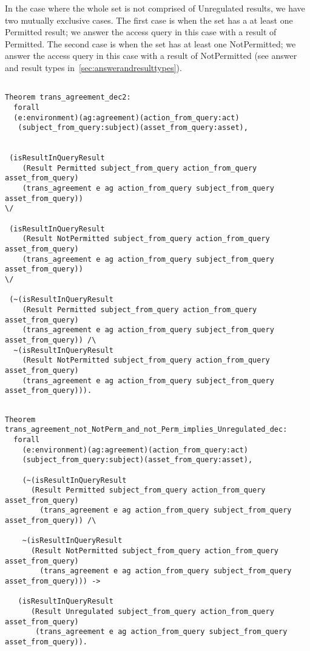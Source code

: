 In the case where the whole set is not comprised of Unregulated results, we have two mutually exclusive cases. The first case is when the set has a at least one Permitted result; we answer the access query in this case with a result of Permitted. The second case is when the set has at least one NotPermitted; we answer the access query in this case with a result of NotPermitted (see answer and result types in~\ref{sec:answerandresulttypes}).


\begin{lstlisting}

Theorem trans_agreement_dec2:
  forall
  (e:environment)(ag:agreement)(action_from_query:act)
   (subject_from_query:subject)(asset_from_query:asset),


 (isResultInQueryResult 
    (Result Permitted subject_from_query action_from_query asset_from_query)
    (trans_agreement e ag action_from_query subject_from_query asset_from_query)) 
\/

 (isResultInQueryResult 
    (Result NotPermitted subject_from_query action_from_query asset_from_query)
    (trans_agreement e ag action_from_query subject_from_query asset_from_query))
\/

 (~(isResultInQueryResult 
    (Result Permitted subject_from_query action_from_query asset_from_query)
    (trans_agreement e ag action_from_query subject_from_query asset_from_query)) /\
  ~(isResultInQueryResult 
    (Result NotPermitted subject_from_query action_from_query asset_from_query)
    (trans_agreement e ag action_from_query subject_from_query asset_from_query))).

\end{lstlisting}

\begin{lstlisting}

Theorem trans_agreement_not_NotPerm_and_not_Perm_implies_Unregulated_dec:
  forall
    (e:environment)(ag:agreement)(action_from_query:act)
    (subject_from_query:subject)(asset_from_query:asset),

    (~(isResultInQueryResult
      (Result Permitted subject_from_query action_from_query asset_from_query)
        (trans_agreement e ag action_from_query subject_from_query asset_from_query)) /\

    ~(isResultInQueryResult
      (Result NotPermitted subject_from_query action_from_query asset_from_query)
        (trans_agreement e ag action_from_query subject_from_query asset_from_query))) ->

   (isResultInQueryResult
      (Result Unregulated subject_from_query action_from_query asset_from_query)
       (trans_agreement e ag action_from_query subject_from_query asset_from_query)).
\end{lstlisting}

